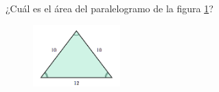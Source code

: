¿Cuál es el \'area del paralelogramo de la figura \ref{fig:area_isoseles_01}?
\begin{figure}[H]
    \begin{center}
        \includegraphics[width=0.3\textwidth]{../images/area_isoseles_01.png}
    \end{center}
    \caption{}
    \label{fig:area_isoseles_01}
\end{figure}